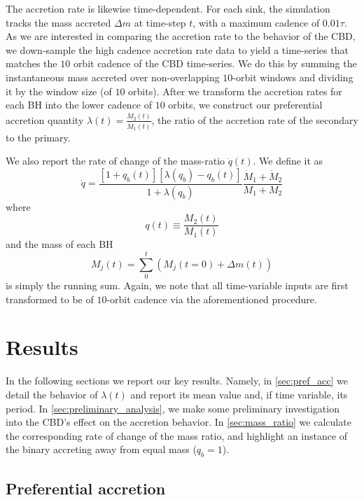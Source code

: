 \documentclass[fleqn,usenatbib]{mnras}
\begin{document}
The accretion rate is likewise time-dependent. For each sink, the simulation tracks the mass accreted $\Delta m$ at time-step $t$, with a maximum cadence of $0.01 \tau$. As we are interested in comparing the accretion rate to the behavior of the CBD, we down-sample the high cadence accretion rate data to yield a time-series that matches the $10$ orbit cadence of the CBD time-series. We do this by summing the instantaneous mass accreted over non-overlapping $10$-orbit windows and dividing it by the window size (of $10$ orbits). After we transform the accretion rates for each BH into the lower cadence of $10$ orbits, we construct our preferential accretion quantity $\lambda(t) = \frac{\dot{M}_2(t)}{\dot{M}_1(t)}$, the ratio of the accretion rate of the secondary to the primary.

We also report the rate of change of the mass-ratio $\dot{q}(t)$. We define it as 
\begin{equation}\label{eqn:q_dot}
    \dot{q} = \frac{[1+q_b(t)][\lambda(q_b) - q_b(t)]}{1 + \lambda(q_b)}\frac{\dot{M}_1 +\dot{M}_2}{M_1 + M_2}
\end{equation}
where
\begin{equation}
    q(t) \equiv \frac{M_2 (t)}{M_1 (t)}
\end{equation}
and the mass of each BH
\begin{equation}
    M_j(t) = \sum_{0}^{t} (M_j(t=0) + \Delta m(t))
\end{equation}
is simply the running sum. Again, we note that all time-variable inputs are first transformed to be of $10$-orbit cadence via the aforementioned procedure.


\section{Results}\label{sec:results}
In the following sections we report our key results. Namely, in \autoref{sec:pref_acc} we detail the behavior of $\lambda(t)$ and report its mean value and, if time variable, its period. In \autoref{sec:preliminary_analysis}, we make some preliminary investigation into the CBD's effect on the accretion behavior. In \autoref{sec:mass_ratio} we calculate the corresponding rate of change of the mass ratio, and highlight an instance of the binary accreting away from equal mass ($q_b = 1$).

\subsection{Preferential accretion}\label{sec:pref_acc}
\end{document}
